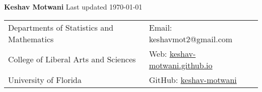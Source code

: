 \documentclass[margin,centered]{res}
\begin{document}
\noindent  \hspace{-97pt} {\LARGE{\bfseries Keshav Motwani}} \hspace*{\fill}  {\small Last updated \monthyeardate\today }\\

\vspace{-12pt}
\hspace{-95pt} \begin{tabular}{@{}p{3.4in}p{2.9in}}
Departments of Statistics and Mathematics   & \hfill Email: keshavmot2@gmail.com\\
College of Liberal Arts and Sciences  & \hfill   Web: \href{https://keshav-motwani.github.io}{keshav-motwani.github.io}\\
University of Florida & \hfill  GitHub: \href{https://github.com/keshav-motwani/}{keshav-motwani}\\
\end{tabular}

\vspace{-5pt}
\end{document}
